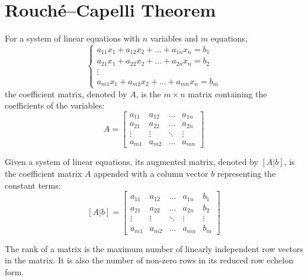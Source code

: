 \chapter{Rouch\'{e}--Capelli Theorem}

\begin{definition}
    \label{def:Coefficient_Matrix}
    For a system of linear equations with $n$ variables and $m$ equations,
    $$
    \begin{cases}
        a_{11}x_1 + a_{12}x_2 + \dots + a_{1n}x_n = b_1 \\
        a_{21}x_1 + a_{22}x_2 + \dots + a_{2n}x_n = b_2 \\
        \vdots \\
        a_{m1}x_1 + a_{m2}x_2 + \dots + a_{mn}x_n = b_m
    \end{cases}
    $$
    the coefficient matrix, denoted by $A$, is the $m \times n$ matrix containing the coefficients of the variables:
    $$ A = \begin{bmatrix} a_{11} & a_{12} & \dots & a_{1n} \\ a_{21} & a_{22} & \dots & a_{2n} \\ \vdots & \vdots & \ddots & \vdots \\ a_{m1} & a_{m2} & \dots & a_{mn} \end{bmatrix} $$
\end{definition}

\begin{definition}
    \label{def:Augmented_Matrix}
    Given a system of linear equations, its augmented matrix, denoted by $[A|b]$, is the coefficient matrix $A$ appended with a column vector $b$ representing the constant terms:
    $$ [A|b] = \left[\begin{array}{cccc|c} a_{11} & a_{12} & \dots & a_{1n} & b_1 \\ a_{21} & a_{22} & \dots & a_{2n} & b_2 \\ \vdots & \vdots & \ddots & \vdots & \vdots \\ a_{m1} & a_{m2} & \dots & a_{mn} & b_m \end{array}\right] $$
\end{definition}

\begin{definition}
    \label{def:Rank_of_a_Matrix}
    The rank of a matrix is the maximum number of linearly independent row vectors in the matrix. It is also the number of non-zero rows in its reduced row echelon form.
\end{definition}


